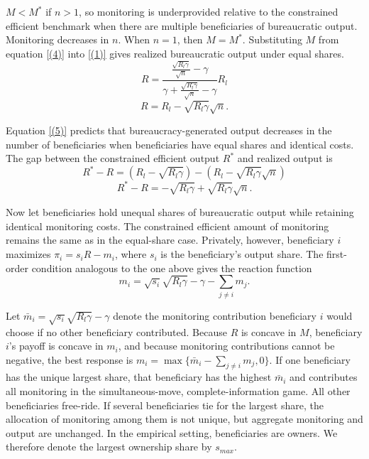 \documentclass[12pt]{article}
\begin{document}
$M<M^*$ if $n>1$, so monitoring is underprovided relative to the constrained efficient benchmark when there are multiple beneficiaries of bureaucratic output. Monitoring decreases in $n$. When $n=1$, then $M=M^*$. Substituting $M$ from equation \eqref{(4)} into \eqref{(1)} gives realized bureaucratic output under equal shares.
\begin{equation}
    R=\frac{\displaystyle\frac{\sqrt{R_l \gamma}}{\sqrt{n}}-\gamma}{\gamma +\displaystyle\frac{\sqrt{R_l \gamma}}{\sqrt{n}}-\gamma} R_l \nonumber
\end{equation}
\begin{equation} \label{(5)}
    R= R_l-\sqrt{R_l \gamma}\sqrt{n}.
\end{equation}

Equation \eqref{(5)} predicts that bureaucracy-generated output decreases in the number of beneficiaries when beneficiaries have equal shares and identical costs. The gap between the constrained efficient output $R^*$ and realized output is
\begin{equation}
    R^*-R=(R_l - \sqrt{R_l \gamma})-(R_l-\sqrt{R_l \gamma}\sqrt{n}) \nonumber
\end{equation}
\begin{equation} \label{(6)}
    R^*-R=- \sqrt{R_l\gamma} + \sqrt{R_l\gamma}\sqrt{n}.
\end{equation}

Now let beneficiaries hold unequal shares of bureaucratic output while retaining identical monitoring costs. The constrained efficient amount of monitoring remains the same as in the equal-share case. Privately, however, beneficiary $i$ maximizes $\pi_i=s_i R-m_i$, where $s_i$ is the beneficiary's output share. The first-order condition analogous to the one above gives the reaction function
\begin{equation} \label{(7)}
    m_i = \sqrt{s_i} \sqrt{R_l \gamma} -\gamma -\sum_{j\neq i}{m_j}.
\end{equation}

Let $\bar m_i=\sqrt{s_i}\sqrt{R_l\gamma}-\gamma$ denote the monitoring contribution beneficiary $i$ would choose if no other beneficiary contributed. Because $R$ is concave in $M$, beneficiary $i$'s payoff is concave in $m_i$, and because monitoring contributions cannot be negative, the best response is $m_i=\max\{\bar m_i-\sum_{j\neq i}m_j,0\}$. If one beneficiary has the unique largest share, that beneficiary has the highest $\bar m_i$ and contributes all monitoring in the simultaneous-move, complete-information game. All other beneficiaries free-ride. If several beneficiaries tie for the largest share, the allocation of monitoring among them is not unique, but aggregate monitoring and output are unchanged. In the empirical setting, beneficiaries are owners. We therefore denote the largest ownership share by $s_{max}$.
\end{document}
